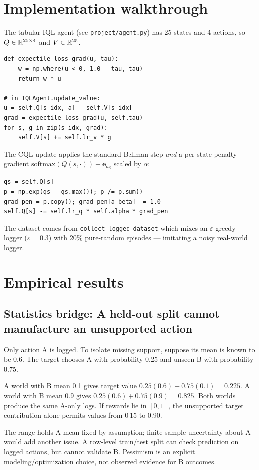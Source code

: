 \documentclass[11pt,oneside]{scrbook}
\begin{document}
\chapter{Implementation walkthrough}

The tabular IQL agent (see \texttt{project/agent.py}) has 25 states and 4 actions, so
$Q \in \mathbb{R}^{25 \times 4}$ and $V \in \mathbb{R}^{25}$.

\begin{codebox}
\begin{verbatim}
def expectile_loss_grad(u, tau):
    w = np.where(u < 0, 1.0 - tau, tau)
    return w * u

# in IQLAgent.update_value:
u = self.Q[s_idx, a] - self.V[s_idx]
grad = expectile_loss_grad(u, self.tau)
for s, g in zip(s_idx, grad):
    self.V[s] += self.lr_v * g
\end{verbatim}
\end{codebox}

The CQL update applies the standard Bellman step \emph{and} a per-state penalty
gradient $\mathrm{softmax}(Q(s,\cdot)) - \mathbf{e}_{a_\beta}$ scaled by $\alpha$:

\begin{codebox}
\begin{verbatim}
qs = self.Q[s]
p = np.exp(qs - qs.max()); p /= p.sum()
grad_pen = p.copy(); grad_pen[a_beta] -= 1.0
self.Q[s] -= self.lr_q * self.alpha * grad_pen
\end{verbatim}
\end{codebox}

The dataset comes from \texttt{collect\_logged\_dataset} which mixes an
$\varepsilon$-greedy logger ($\varepsilon = 0.3$) with 20\% pure-random episodes ---
imitating a noisy real-world logger.

\chapter{Empirical results}

\section{Statistics bridge: A held-out split cannot manufacture an unsupported action}
\begin{example}
Only action A is logged. To isolate missing support, suppose its mean is known to be 0.6. The target chooses A with probability 0.25 and unseen B with probability 0.75.

A world with B mean 0.1 gives target value $0.25(0.6)+0.75(0.1)=0.225$. A world with B mean 0.9 gives $0.25(0.6)+0.75(0.9)=0.825$. Both worlds produce the same A-only logs. If rewards lie in $[0,1]$, the unsupported target contribution alone permits values from 0.15 to 0.90.
\end{example}
The range holds A mean fixed by assumption; finite-sample uncertainty about A would add another issue. A row-level train/test split can check prediction on logged actions, but cannot validate B. Pessimism is an explicit modeling/optimization choice, not observed evidence for B outcomes.
\end{document}
